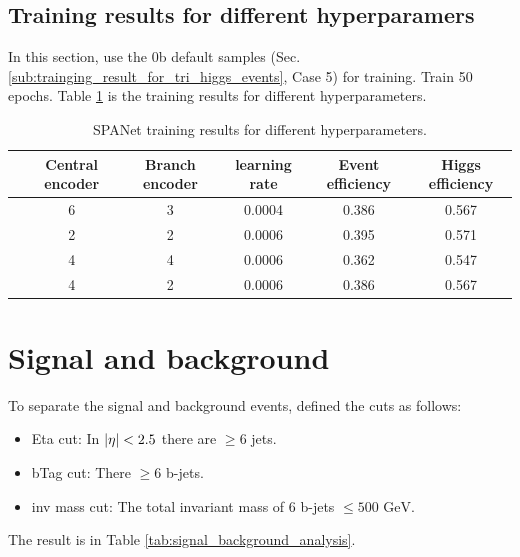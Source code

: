 \documentclass[12pt]{article}
\begin{document}
	\subsection{Training results for different hyperparamers}%
	\label{sub:training_results_for_different_hyperparamers}
		In this section, use the 0b default samples (Sec.\ref{sub:trainging_result_for_tri_higgs_events}, Case 5) for training. Train 50 epochs. Table \ref{tab:SPANet_hp_50ep} is the training results for different hyperparameters.
		
		\begin{table}[htpb]
			\centering
			\caption{SPANet training results for different hyperparameters.}
			\label{tab:SPANet_hp_50ep}
			\begin{tabular}{cccc|cc}
			 & Central encoder & Branch encoder & learning rate & Event efficiency & Higgs efficiency \\
			 \hline
			 &    6             &     3           &  0.0004             &   0.386               &    0.567              \\
			 &    2             &     2           &  0.0006             &   0.395               &    0.571              \\
			 &    4             &     4           &  0.0006             &   0.362               &    0.547             \\
			 &    4             &     2           &  0.0006             &   0.386               &    0.567             
			\end{tabular}
		\end{table}

\section{Signal and background}%
\label{sec:signal_and_background}
	To separate the signal and background events, defined the cuts as follows:
	\begin{itemize}
		\item Eta cut: In $\abs{\eta} < 2.5$ there are $\ge 6$ jets.
		\item bTag cut: There $\ge 6$ b-jets.
		\item inv mass cut: The total invariant mass of 6 b-jets $\le 500 \text{ GeV}$.
	\end{itemize}

	The result is in Table \ref{tab:signal_background_analysis}.
\end{document}
